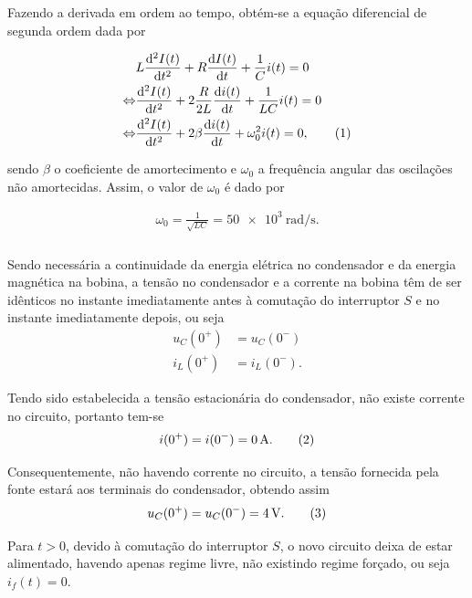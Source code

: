 \documentclass[a4paper, titlepage, portuguese]{article}
\newcommand{\eq}{\Leftrightarrow} %
\newcommand\numberthis{\addtocounter{equation}{1}\tag{\theequation}}
\begin{document}
		Fazendo a derivada em ordem ao tempo, obtém-se a equação diferencial de segunda ordem dada por
		
		\begin{align*}
			&L \dv[2]{I(t)}{t} + R\dv{I(t)}{t} + \frac{1}{C}i(t) = 0 \\ \eq
			&\dv[2]{I(t)}{t} + 2\frac{R}{2L}\dv{i(t)}{t} + \frac{1}{LC}i(t) = 0 \\ \eq
			&\dv[2]{I(t)}{t} + 2\beta \dv{i(t)}{t} + \omega_{0}^{2} i(t) = 0, \numberthis \label{eq_dif_2ordem}
		\end{align*}
	
		sendo $\beta$ o coeficiente de amortecimento e $\omega_{0}$ a frequência angular das oscilações não amortecidas. Assim, o valor de $\omega_{0}$ é dado por
		
		\begin{align*}
			\omega_{0} = \frac{1}{\sqrt{LC}} = \SI{50e3}{\radian\per\second}.
		\end{align*}
	
	\subsubsection{}
	
		\par
		Sendo necessária a continuidade da energia elétrica no condensador e da energia magnética na bobina, a tensão no condensador e a corrente na bobina têm de ser idênticos no instante imediatamente antes à comutação do interruptor $S$ e no instante imediatamente depois, ou seja
		\begin{align*}
			u_{C}(0^{+}) &= u_{C}(0^{-})\\
			  i_{L}(0^{+}) &= i_{L}(0^{-}).
		\end{align*}
		
		Tendo sido estabelecida a tensão estacionária do condensador, não existe corrente no circuito, portanto tem-se 
		\begin{align*}
			i(0^{+}) = i(0^{-}) = \SI{0}{\ampere}. \numberthis \label{cond_inicial_corrente}
		\end{align*}
		
		Consequentemente, não havendo corrente no circuito, a tensão fornecida pela fonte estará aos terminais do condensador, obtendo assim
		\begin{align*}
			u_{C}(0^{+}) = u_{C}(0^{-}) = \SI{4}{\volt}. \numberthis \label{cond_inicial_tensão}
		\end{align*}
		
		Para $t > 0$, devido à comutação do interruptor $S$, o novo circuito deixa de estar alimentado, havendo apenas regime livre, não existindo regime forçado, ou seja $i_f(t) = 0$.
		
\end{document}
